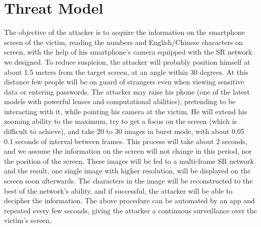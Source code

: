\section{Threat Model}
\label{sec-threat-model} 
The objective of the attacker is to acquire the information on the smartphone screen of the victim, reading the numbers and English/Chinese characters on screen, with the help of his smartphone’s camera equipped with the SR network we designed. To reduce suspicion, the attacker will probably position himself at about 1.5 meters from the target screen, at an angle within 30 degrees. At this distance few people will be on guard of strangers even when viewing sensitive data or entering passwords. The attacker may raise his phone (one of the latest models with powerful lenses and computational abilities), pretending to be interacting with it, while pointing his camera at the victim. He will extend his zooming ability to the maximum, try to get a focus on the screen (which is difficult to achieve), and take 20 to 30 images in burst mode, with about 0.05 ~ 0.1 seconds of interval between frames. This process will take about 2 seconds, and we assume the information on the screen will not change in this period, nor the position of the screen. These images will be fed to a multi-frame SR network and the result, one single image with higher resolution, will be displayed on the screen soon afterwards. The characters in the image will be reconstructed to the best of the network’s ability, and if successful, the attacker will be able to decipher the information. The above procedure can be automated by an app and repeated every few seconds, giving the attacker a continuous surveillance over the victim’s screen.
